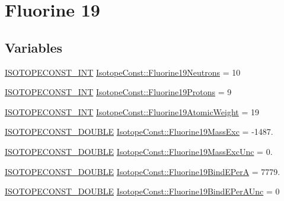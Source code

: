 \hypertarget{group___isotope_const-_fluorine-_f19}{}\section{Fluorine 19}
\label{group___isotope_const-_fluorine-_f19}
\subsection*{Variables}
\begin{DoxyCompactItemize}
\item 
\mbox{\hyperlink{group___isotope_const-_macros_ga5f18360b3e99483a35c32d789e62621c}{I\+S\+O\+T\+O\+P\+E\+C\+O\+N\+S\+T\+\_\+\+I\+NT}} \mbox{\hyperlink{group___isotope_const-_fluorine-_f19_gaa9df6f9d82b4a2315e7f2015d54d222f}{Isotope\+Const\+::\+Fluorine19\+Neutrons}} = 10
\item 
\mbox{\hyperlink{group___isotope_const-_macros_ga5f18360b3e99483a35c32d789e62621c}{I\+S\+O\+T\+O\+P\+E\+C\+O\+N\+S\+T\+\_\+\+I\+NT}} \mbox{\hyperlink{group___isotope_const-_fluorine-_f19_gad2ef9d69557f963db382fd103c3ef09e}{Isotope\+Const\+::\+Fluorine19\+Protons}} = 9
\item 
\mbox{\hyperlink{group___isotope_const-_macros_ga5f18360b3e99483a35c32d789e62621c}{I\+S\+O\+T\+O\+P\+E\+C\+O\+N\+S\+T\+\_\+\+I\+NT}} \mbox{\hyperlink{group___isotope_const-_fluorine-_f19_ga713791019daa40d27f91c1863bca69aa}{Isotope\+Const\+::\+Fluorine19\+Atomic\+Weight}} = 19
\item 
\mbox{\hyperlink{group___isotope_const-_macros_ga8f45a7272ce02c0b4c65c44636ed719a}{I\+S\+O\+T\+O\+P\+E\+C\+O\+N\+S\+T\+\_\+\+D\+O\+U\+B\+LE}} \mbox{\hyperlink{group___isotope_const-_fluorine-_f19_gab4e8bc121c7c67aba386edb9f98feb75}{Isotope\+Const\+::\+Fluorine19\+Mass\+Exc}} = -\/1487.
\item 
\mbox{\hyperlink{group___isotope_const-_macros_ga8f45a7272ce02c0b4c65c44636ed719a}{I\+S\+O\+T\+O\+P\+E\+C\+O\+N\+S\+T\+\_\+\+D\+O\+U\+B\+LE}} \mbox{\hyperlink{group___isotope_const-_fluorine-_f19_ga87aee3caf6c68efa2a9bcace61287253}{Isotope\+Const\+::\+Fluorine19\+Mass\+Exc\+Unc}} = 0.
\item 
\mbox{\hyperlink{group___isotope_const-_macros_ga8f45a7272ce02c0b4c65c44636ed719a}{I\+S\+O\+T\+O\+P\+E\+C\+O\+N\+S\+T\+\_\+\+D\+O\+U\+B\+LE}} \mbox{\hyperlink{group___isotope_const-_fluorine-_f19_ga2725e9b3bf29a0ba1bf872d1e5b20fbe}{Isotope\+Const\+::\+Fluorine19\+Bind\+E\+PerA}} = 7779.
\item 
\mbox{\hyperlink{group___isotope_const-_macros_ga8f45a7272ce02c0b4c65c44636ed719a}{I\+S\+O\+T\+O\+P\+E\+C\+O\+N\+S\+T\+\_\+\+D\+O\+U\+B\+LE}} \mbox{\hyperlink{group___isotope_const-_fluorine-_f19_ga10f29b7ec7b3e4ebea866bf5b4d02bd8}{Isotope\+Const\+::\+Fluorine19\+Bind\+E\+Per\+A\+Unc}} = 0

\end{DoxyCompactItemize}
